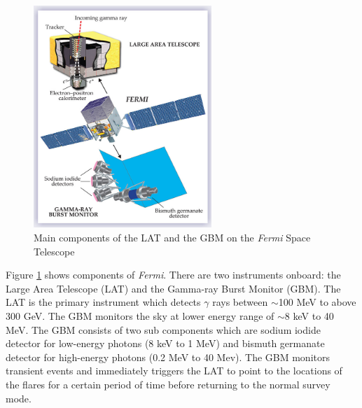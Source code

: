 \begin{figure}[h!]
    \centering
    \includegraphics[width=0.6\textwidth]{content/background/figures/fermi_instrument.jpeg}
    \caption{
        Main components of the LAT and the GBM on the \textit{Fermi}
        Space Telescope \citep{fermi_lat_instrument_first_year}}
    \label{fig:fermi_main_components}
\end{figure}

Figure \ref{fig:fermi_main_components} shows
components of \textit{Fermi}.
There are two instruments onboard: the Large Area Telescope (LAT)
and the Gamma-ray Burst Monitor (GBM).
The LAT is the primary instrument which detects $\gamma$ rays
between $\sim$100 MeV to above 300 GeV. The GBM monitors the sky at
lower energy range of $\sim$8 keV to 40 MeV.
The GBM consists of two 
sub components which are sodium iodide detector for low-energy photons
(8 keV to 1 MeV) and bismuth germanate detector for high-energy photons 
(0.2 MeV to 40 Mev).
The GBM monitors transient events and immediately triggers the
LAT to point to the locations of the flares for a certain period
of time before returning to the normal survey mode.

